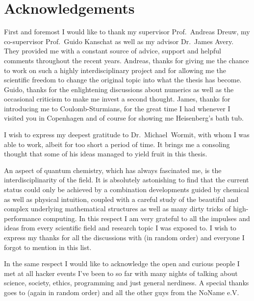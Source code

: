 \chapter*{Acknowledgements} 
{}

First and foremost I would like to thank
my supervisor Prof.~Andreas Dreuw,
my co-supervisor Prof.~Guido Kanschat
as well as my advisor Dr.~James Avery.
They provided me with a constant source of advice, support
and helpful comments throughout the recent years.
Andreas, thanks for giving me the chance to work on such
a highly interdisciplinary project
and for allowing me the scientific freedom
to change the original topic into what the thesis has become.
Guido, thanks for the enlightening discussions about numerics
as well as the occasional criticism to make me invest a second thought.
James, thanks for introducing me to Coulomb-Sturmians,
for the great time I had whenever I visited you in Copenhagen
and of course for showing me Heisenberg's bath tub.

I wish to express my deepest gratitude to Dr.~Michael~Wormit,
with whom I was able to work,
albeit for too short a period of time.
It brings me a consoling thought that some of his
ideas managed to yield fruit in this thesis.


An aspect of quantum chemistry,
which has always fascinated me,
is the interdisciplinarity of the field.
It is absolutely astonishing
to find that the current status could only be achieved
by a combination developments guided by chemical as well as physical intuition,
coupled with a careful study of the beautiful and complex
underlying mathematical structures
as well as many dirty tricks of high-performance computing.
In this respect I am very grateful
to all the impulses and ideas from
every scientific field and research topic I was exposed to.
I wish to express my thanks for all the discussions with
(in random order)
%
and everyone I forgot to mention in this list.


In the same respect I would like to acknowledge the open and curious
people I met at all hacker events I've been to so far
with many nights of talking
about science, society, ethics, programming and just general nerdiness.
A special thanks goes to 
(again in random order)
%
and all the other guys from the NoName e.V.

